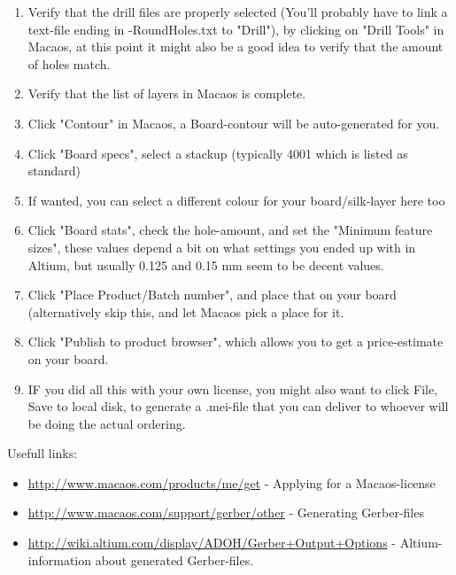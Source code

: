 \begin {enumerate}
can be used as "Board".
\item Verify that the drill files are properly selected (You'll probably have to link a text-file ending in -RoundHoles.txt to "Drill"), by clicking on "Drill Tools" in Macaos, at this point it might also
be a good idea to verify that the amount of holes match.
\item Verify that the list of layers in Macaos is complete.
\item Click "Contour" in Macaos, a Board-contour will be auto-generated for you.
\item Click "Board specs", select a stackup (typically 4001 which is listed as standard)
\item If wanted, you can select a different colour for your board/silk-layer here too
\item Click "Board stats", check the hole-amount, and set the "Minimum feature sizes", these values depend a bit on what settings you ended up with in Altium, but usually 0.125 and 0.15 mm seem to be decent values.
\item Click "Place Product/Batch number", and place that on your board (alternatively skip this, and let Macaos pick a place for it.
\item Click "Publish to product browser", which allows you to get a price-estimate on your board.
\item IF you did all this with your own license, you might also want to click File, Save to local disk, to generate a .mei-file that you can deliver to whoever will be doing the actual ordering.
\end {enumerate}

Usefull links:
\begin {itemize}
\item \url{http://www.macaos.com/products/me/get} - Applying for a Macaos-license
\item \url{http://www.macaos.com/support/gerber/other} - Generating Gerber-files
\item \url{http://wiki.altium.com/display/ADOH/Gerber+Output+Options} - Altium-information about generated Gerber-files.
\end {itemize}
